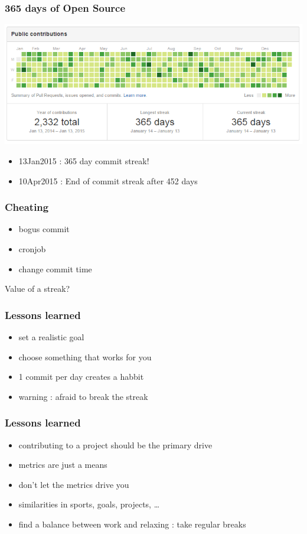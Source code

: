 \documentclass[14pt]{beamer}
\begin{document}
  \begin{frame}
    \frametitle{365 days of Open Source}
    \includegraphics[scale=.45]{github_oss365_13jan2015.png}
    \begin{itemize}
      \item 13Jan2015 : 365 day commit streak!
      \item 10Apr2015 : End of commit streak after 452 days
    \end{itemize}
  \end{frame}
  \begin{frame}
    \frametitle{Cheating}
    \begin{itemize}
      \item bogus commit
      \item cronjob
      \item change commit time
    \end{itemize}
    Value of a streak?
  \end{frame}
  \begin{frame}
    \frametitle{Lessons learned}
    \begin{itemize}
      \item set a realistic goal
      \item choose something that works for you
      \item 1 commit per day creates a habbit
      \item warning : afraid to break the streak
    \end{itemize}
  \end{frame}
  \begin{frame}
    \frametitle{Lessons learned}
    \begin{itemize}
      \item contributing to a project should be the primary drive
      \item metrics are just a means
      \item don't let the metrics drive you
      \item similarities in sports, goals, projects, \ldots
      \item find a balance between work and relaxing : take regular breaks
    \end{itemize}
  \end{frame}
\end{document}
